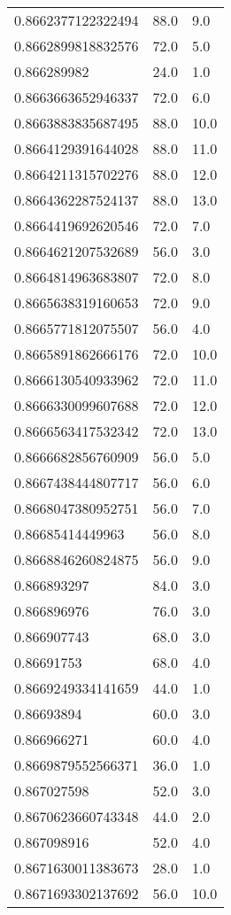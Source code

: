 \begin{center}
\begin{supertabular}[H]{p{0.30\textwidth}p{0.05\textwidth}p{0.05\textwidth}}
0.8662377122322494 & 88.0 & 9.0 \\ 
0.8662899818832576 & 72.0 & 5.0 \\ 
0.866289982 & 24.0 & 1.0 \\ 
0.8663663652946337 & 72.0 & 6.0 \\ 
0.8663883835687495 & 88.0 & 10.0 \\ 
0.8664129391644028 & 88.0 & 11.0 \\ 
0.8664211315702276 & 88.0 & 12.0 \\ 
0.8664362287524137 & 88.0 & 13.0 \\ 
0.8664419692620546 & 72.0 & 7.0 \\ 
0.8664621207532689 & 56.0 & 3.0 \\ 
0.8664814963683807 & 72.0 & 8.0 \\ 
0.8665638319160653 & 72.0 & 9.0 \\ 
0.8665771812075507 & 56.0 & 4.0 \\ 
0.8665891862666176 & 72.0 & 10.0 \\ 
0.8666130540933962 & 72.0 & 11.0 \\ 
0.8666330099607688 & 72.0 & 12.0 \\ 
0.8666563417532342 & 72.0 & 13.0 \\ 
0.8666682856760909 & 56.0 & 5.0 \\ 
0.8667438444807717 & 56.0 & 6.0 \\ 
0.8668047380952751 & 56.0 & 7.0 \\ 
0.86685414449963 & 56.0 & 8.0 \\ 
0.8668846260824875 & 56.0 & 9.0 \\ 
0.866893297 & 84.0 & 3.0 \\ 
0.866896976 & 76.0 & 3.0 \\ 
0.866907743 & 68.0 & 3.0 \\ 
0.86691753 & 68.0 & 4.0 \\ 
0.8669249334141659 & 44.0 & 1.0 \\ 
0.86693894 & 60.0 & 3.0 \\ 
0.866966271 & 60.0 & 4.0 \\ 
0.8669879552566371 & 36.0 & 1.0 \\ 
0.867027598 & 52.0 & 3.0 \\ 
0.8670623660743348 & 44.0 & 2.0 \\ 
0.867098916 & 52.0 & 4.0 \\ 
0.8671630011383673 & 28.0 & 1.0 \\ 
0.8671693302137692 & 56.0 & 10.0 \\ 

\end{supertabular}
\end{center}
